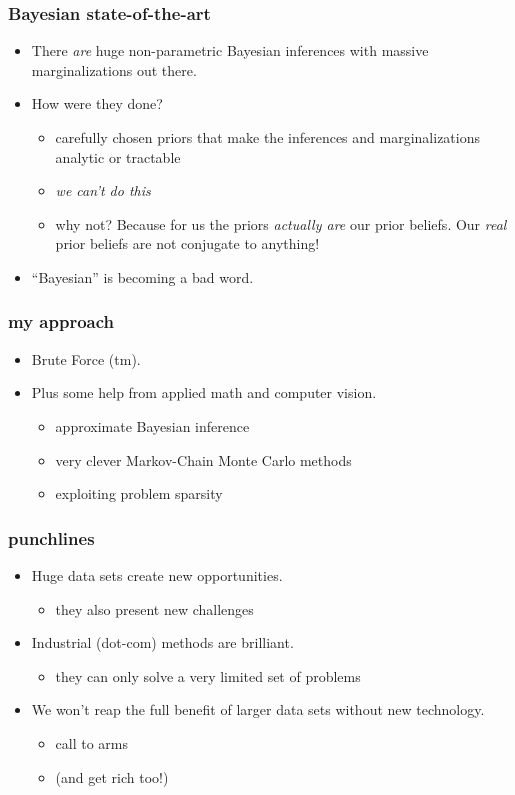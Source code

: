 \documentclass[pdftex]{beamer}
\newcommand{\conclusion}{
\begin{frame}
  \frametitle{punchlines}
  \begin{itemize}
  \item Huge data sets create new opportunities.
    \begin{itemize}
    \item they also present new challenges
    \end{itemize}
  \item Industrial (dot-com) methods are brilliant.
    \begin{itemize}
    \item they can only solve a very limited set of problems
    \end{itemize}
  \item We won't reap the full benefit of larger data sets without new technology.
    \begin{itemize}
    \item call to arms
    \item (and get rich too!)
    \end{itemize}
  \end{itemize}
\end{frame}
}
\begin{document}
\begin{frame}
  \frametitle{Bayesian state-of-the-art}
  \begin{itemize}
  \item There \emph{are} huge non-parametric Bayesian inferences with
    massive marginalizations out there.
  \item How were they done?
    \begin{itemize}
    \item carefully chosen priors that make the inferences and
      marginalizations analytic or tractable
    \item \emph{we can't do this}
    \item why not?  Because for us the priors \emph{actually are} our
      prior beliefs.  Our \emph{real} prior beliefs are not conjugate
      to anything!
    \end{itemize}
  \item ``Bayesian'' is becoming a bad word.
  \end{itemize}
\end{frame}

\begin{frame}
  \frametitle{my approach}
  \begin{itemize}
  \item<2-> Brute Force (tm).
  \item<3-> Plus some help from applied math and computer vision.
    \begin{itemize}
    \item approximate Bayesian inference
    \item very clever Markov-Chain Monte Carlo methods
    \item exploiting problem sparsity
    \end{itemize}
  \end{itemize}
\end{frame}

\conclusion
\end{document}
